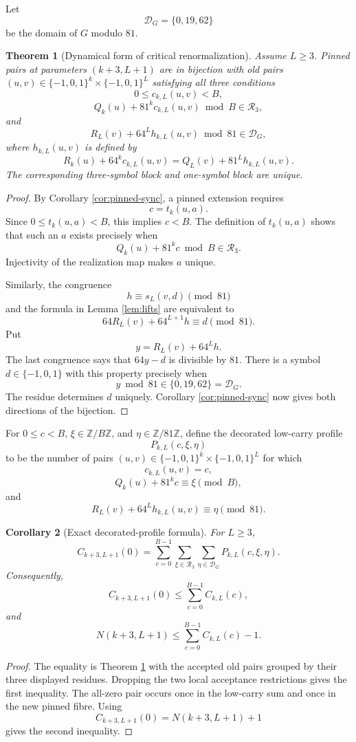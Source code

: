 \documentclass[11pt]{article}
\newtheorem{theorem}{Theorem}[section]
\newtheorem{corollary}[theorem]{Corollary}
\theoremstyle{remark}
\newcommand{\Z}{\mathbb{Z}}
\newcommand{\E}{\{-1,0,1\}}
\newcommand{\Rset}{\mathcal{R}}
\newcommand{\Dset}{\mathcal{D}}
\begin{document}
Let
\[
\Dset_G=\{0,19,62\}
\]
be the domain of $G$ modulo $81$.

\begin{theorem}[Dynamical form of critical renormalization]
\label{thm:dynamical-renorm}
Assume $L\ge3$.  Pinned pairs at parameters $(k+3,L+1)$ are in bijection with old pairs $(u,v)\in\E^k\times\E^L$ satisfying all three conditions
\[
0\le c_{k,L}(u,v)<B,
\]
\[
Q_k(u)+81^k c_{k,L}(u,v)\bmod B\in\Rset_3,
\]
and
\[
R_L(v)+64^L h_{k,L}(u,v)\bmod81\in\Dset_G,
\]
where $h_{k,L}(u,v)$ is defined by
\[
R_k(u)+64^k c_{k,L}(u,v)
=Q_L(v)+81^L h_{k,L}(u,v).
\]
The corresponding three-symbol block and one-symbol block are unique.
\end{theorem}

\begin{proof}
By Corollary \ref{cor:pinned-sync}, a pinned extension requires
\[
c=t_k(u,a).
\]
Since $0\le t_k(u,a)<B$, this implies $c<B$.  The definition of $t_k(u,a)$ shows that such an $a$ exists precisely when
\[
Q_k(u)+81^kc\bmod B\in\Rset_3.
\]
Injectivity of the realization map makes $a$ unique.

Similarly, the congruence
\[
h\equiv s_L(v,d)\pmod{81}
\]
and the formula in Lemma \ref{lem:lifts} are equivalent to
\[
64R_L(v)+64^{L+1}h\equiv d\pmod{81}.
\]
Put
\[
y=R_L(v)+64^Lh.
\]
The last congruence says that $64y-d$ is divisible by $81$.  There is a symbol $d\in\E$ with this property precisely when
\[
y\bmod81\in\{0,19,62\}=\Dset_G.
\]
The residue determines $d$ uniquely.  Corollary \ref{cor:pinned-sync} now gives both directions of the bijection.
\end{proof}

For $0\le c<B$, $\xi\in\Z/B\Z$, and $\eta\in\Z/81\Z$, define the decorated low-carry profile
\[
P_{k,L}(c,\xi,\eta)
\]
to be the number of pairs $(u,v)\in\E^k\times\E^L$ for which
\[
c_{k,L}(u,v)=c,
\]
\[
Q_k(u)+81^kc\equiv\xi\pmod B,
\]
and
\[
R_L(v)+64^Lh_{k,L}(u,v)\equiv\eta\pmod{81}.
\]

\begin{corollary}[Exact decorated-profile formula]
\label{cor:profile}
For $L\ge3$,
\[
C_{k+3,L+1}(0)
=
\sum_{c=0}^{B-1}
\sum_{\xi\in\Rset_3}
\sum_{\eta\in\Dset_G}
P_{k,L}(c,\xi,\eta).
\]
Consequently,
\[
C_{k+3,L+1}(0)
\le
\sum_{c=0}^{B-1}C_{k,L}(c),
\]
and
\[
N(k+3,L+1)
\le
\sum_{c=0}^{B-1}C_{k,L}(c)-1.
\]
\end{corollary}

\begin{proof}
The equality is Theorem \ref{thm:dynamical-renorm} with the accepted old pairs grouped by their three displayed residues.  Dropping the two local acceptance restrictions gives the first inequality.  The all-zero pair occurs once in the low-carry sum and once in the new pinned fibre.  Using
\[
C_{k+3,L+1}(0)=N(k+3,L+1)+1
\]
gives the second inequality.
\end{proof}
\end{document}
